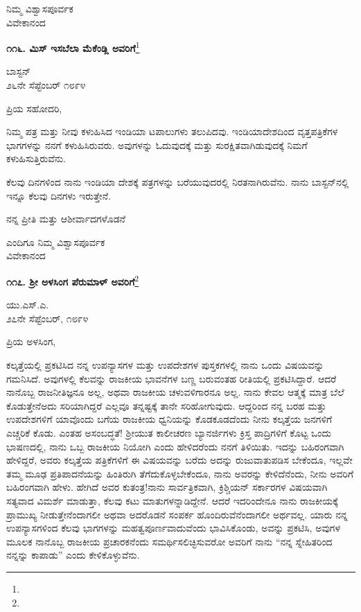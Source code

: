 {\flushright
ನಿಮ್ಮ ವಿಶ್ವಾಸಪೂರ್ವಕ\\ವಿವೇಕಾನಂದ\par}

\begin{center}
\textbf{೧೧೬. ಮಿಸ್ ಇಸಬೆಲಾ ಮೆಕೆಂಡ್ಲಿ ಅವರಿಗೆ}\footnote{}
\end{center}

\begin{flushright}
ಬಾಸ್ಟನ್\\೨೬ನೇ ಸೆಪ್ಟೆಂಬರ್ ೧೮೯೪
\end{flushright}

\noindent
ಪ್ರಿಯ ಸಹೋದರಿ,

ನಿಮ್ಮ ಪತ್ರ ಮತ್ತು ನೀವು ಕಳುಹಿಸಿದ ಇಂಡಿಯಾ ಟಪಾಲುಗಳು ತಲುಪಿದವು. ಇಂಡಿಯಾದೇಶದಿಂದ ವೃತ್ತಪತ್ರಿಕೆಗಳ ಭಾಗಗಳನ್ನು ನನಗೆ ಕಳುಹಿಸಿರುವರು. ಅವುಗಳನ್ನು ಓದುವುದಕ್ಕೆ ಮತ್ತು ಸುರಕ್ಷಿತವಾಗಿಡುವುದಕ್ಕೆ ನಿಮಗೆ ಕಳುಹಿಸುತ್ತಿರುವೆನು.

ಕೆಲವು ದಿನಗಳಿಂದ ನಾನು ಇಂಡಿಯಾ ದೇಶಕ್ಕೆ ಪತ್ರಗಳನ್ನು ಬರೆಯುವುದರಲ್ಲಿ ನಿರತನಾಗಿರುವೆನು. ನಾನು ಬಾಸ್ಟನ್‌ನಲ್ಲಿ ಇನ್ನೂ ಕೆಲವು ದಿನಗಳು ಇರುತ್ತೇನೆ.

ನನ್ನ ಪ್ರೀತಿ ಮತ್ತು ಆಶೀರ್ವಾದಗಳೊಡನೆ

{\flushright
ಎಂದಿಗೂ ನಿಮ್ಮ ವಿಶ್ವಾಸಪೂರ್ವಕ\\ವಿವೇಕಾನಂದ\par}

\begin{center}
\textbf{೧೧೭. ಶ‍್ರೀ ಅಳಸಿಂಗ ಪೆರುಮಾಳ್ ಅವರಿಗೆ}\footnote{}
\end{center}

\begin{flushright}
ಯು.ಎಸ್.ಎ.\\೨೭ನೇ ಸೆಪ್ಟೆಂಬರ್, ೧೮೯೪
\end{flushright}

\noindent
ಪ್ರಿಯ ಅಳಸಿಂಗ,

ಕಲ್ಕತ್ತೆಯಲ್ಲಿ ಪ್ರಕಟಿಸಿದ ನನ್ನ ಉಪನ್ಯಾಸಗಳ ಮತ್ತು ಉಪದೇಶಗಳ ಪುಸ್ತಕಗಳಲ್ಲಿ ನಾನು ಒಂದು ವಿಷಯವನ್ನು ಗಮನಿಸಿದೆ. ಅವುಗಳಲ್ಲಿ ಕೆಲವನ್ನು ರಾಜಕೀಯ ಭಾವನೆಗಳ ಬಣ್ಣ ಬರುವಂತಹ ರೀತಿಯಲ್ಲಿ ಪ್ರಕಟಿಸಿದ್ದಾರೆ. ಆದರೆ ನಾನೊಬ್ಬ ರಾಜನೀತಿಜ್ಞನೂ ಅಲ್ಲ, ಅಥವಾ ರಾಜಕೀಯ ಚಳುವಳಿಗಾರನೂ ಅಲ್ಲ. ನಾನು ಕೇವಲ ಆತ್ಮಕ್ಕೆ ಮಾತ್ರ ಬೆಲೆ ಕೊಡುತ್ತೇನೆ\enginline{-}ಅದು ಸರಿಯಾಗಿದ್ದರೆ ಎಲ್ಲವೂ ತನ್ನಷ್ಟಕ್ಕೆ ತಾನೇ ಸರಿಹೋಗುವುದು. ಆದ್ದರಿಂದ ನನ್ನ ಬರಹ ಮತ್ತು ಉಪದೇಶಗಳಿಗೆ ಯಾವೊಂದು ಬಗೆಯ ರಾಜಕೀಯ ಧ್ವನಿಯನ್ನು ಕೊಡಕೂಡದೆಂದು ನೀನು ಕಲ್ಕತ್ತೆಯ ಜನಗಳಿಗೆ ಎಚ್ಚರಿಕೆ ಕೊಡು. ಎಂತಹ ಅಸಂಬದ್ಧತೆ! ಶ‍್ರೀಯುತ ಕಾಲೀಚರಣ ಬ್ಯಾನರ್ಜಿಗಳು ಕ್ರಿಸ್ತ ಪಾದ್ರಿಗಳಿಗೆ ಕೊಟ್ಟ ಒಂದು ಭಾಷಣದಲ್ಲಿ, ನಾನು ಒಬ್ಬ ರಾಜಕೀಯ ನಿಯೋಗಿ ಎಂದು ಹೇಳಿದರೆಂದು ನನಗೆ ತಿಳಿಯಿತು. ಇದನ್ನು ಬಹಿರಂಗವಾಗಿ ಹೇಳಿದ್ದರೆ, ಅವರು ಕಲ್ಕತ್ತೆಯ ಪತ್ರಿಕೆಗಳಿಗೆ ಈ ವಿಷಯವನ್ನು ಬರೆದು ಅದನ್ನು ರುಜುವಾತುಪಡಿಸ ಬೇಕೆಂದೂ, ಇಲ್ಲವೇ ತಮ್ಮ ಮೂಢ ಪ್ರತಿಪಾದನೆಯನ್ನು ಹಿಂತಿರುಗಿ ತೆಗೆದುಕೊಳ್ಳಬೇಕೆಂದೂ, ನಾನು ಅವರನ್ನು ಕೇಳಿದೆನೆಂದು, ನೀನು ಅವರಿಗೆ ಬಹಿರಂಗವಾಗಿ ಹೇಳು. ಹೇಗಿದೆ ಅವರ ಕುತಂತ್ರ!ನಾನು ಸಾರ್ವತ್ರಿಕವಾಗಿ, ಕ್ರಿಶ್ಚಿಯನ್ ಸರ್ಕಾರಗಳ ವಿಷಯವಾಗಿ ಸತ್ಯವಾದ ವಿಮರ್ಶೆ ಮಾಡುತ್ತಾ, ಕೆಲವು ಕಟು ಮಾತುಗಳನ್ನಾಡಿದ್ದೇನೆ. ಆದರೆ ಇದರಿಂದೇನೂ ನಾನು ರಾಜಕೀಯಕ್ಕೆ ಪ್ರಾಮುಖ್ಯ ನೀಡುತ್ತೇನೆಂದಾಗಲೀ ಅಥವಾ ಅದರೊಡನೆ ಸಂಪರ್ಕ ಹೊಂದಿರುವೆನೆಂದಾಗಲೀ ಅರ್ಥವಲ್ಲ. ಯಾರು ನನ್ನ ಉಪನ್ಯಾಸಗಳಿಂದ ಕೆಲವು ಭಾಗಗಳನ್ನು ಮಹತ್ವಪೂರ್ಣವಾದುವೆಂದು ಭಾವಿಸಿಕೊಂಡು, ಅವನ್ನು ಪ್ರಕಟಿಸಿ, ಅವುಗಳ ಮೂಲಕ ನಾನೊಬ್ಬ ರಾಜಕೀಯ ಪ್ರಚಾರಕನೆಂದು ಸಮರ್ಥಿಸಲಿಚ್ಛಿಸುವರೋ ಅವರಿಗೆ ನಾನು ``ನನ್ನ ಸ್ನೇಹಿತರಿಂದ ನನ್ನನ್ನು ಕಾಪಾಡು” ಎಂದು ಕೇಳಿಕೊಳ್ಳುವೆನು.

